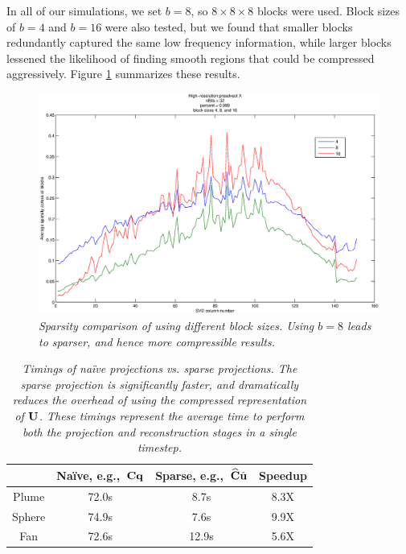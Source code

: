 In all of our simulations, we set $b = 8$, so $8 \times 8 \times 8$ blocks were used. Block sizes of $b = 4$ and $b = 16$ were also tested, but we found that smaller blocks redundantly captured the same low frequency information, while larger blocks lessened the likelihood of finding smooth regions that could be compressed aggressively. Figure \ref{fig:blockcomparison} summarizes these results.

\begin{figure}
	\centering
	\includegraphics[height=0.5\textwidth]{chap4/figures/blockSizeSparsityComparison.eps}
	\caption{\em Sparsity comparison of using different block sizes. Using $b=8$ leads to sparser, and hence more compressible results.}
	\label{fig:blockcomparison}
\end{figure}

\begin{table}
\begin{center}
\begin{tabular}{|c||c|c|c|} \hline
 & Na\"{i}ve, e.g.,~$\mathbf{C}\mathbf{q}$ & Sparse, e.g.,~$\widehat{\mathbf{C}}\hat{\mathbf{u}}$ & Speedup\\
\hline
Plume & 72.0s & 8.7s & 8.3X\\
\hline
Sphere & 74.9s & 7.6s & 9.9X \\
\hline
Fan & 72.6s & 12.9s & 5.6X \\
\hline
\end{tabular}
\end{center}
\caption{\label{tab:naive-vs-sparse}{\em Timings of na\"{i}ve projections vs. sparse projections. The sparse projection is significantly faster, and dramatically reduces the overhead of using the compressed representation of $\mathbf{U}$. These timings represent the average time to perform {\em both} the projection and reconstruction stages in a single timestep.}}
\end{table}

